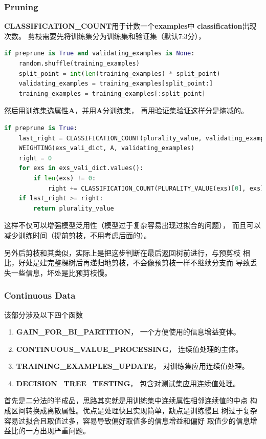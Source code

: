 \documentclass[a4paper, 11pt]{article}
\begin{document}
\subsubsection{Pruning}
\textbf{CLASSIFICATION\_COUNT}用于计数一个\textbf{examples}中
\textbf{classification}出现次数。
剪枝需要先将训练集分为训练集和验证集（默认7:3分），
\begin{lstlisting}[language=python]
if preprune is True and validating_examples is None:
	random.shuffle(training_examples)
	split_point = int(len(training_examples) * split_point)
	validating_examples = training_examples[split_point:]
	training_examples = training_examples[:split_point]
\end{lstlisting}
然后用训练集选属性\textbf{A}，并用\textbf{A}分训练集，
再用验证集验证这样分是熵减的。
\begin{lstlisting}[language=python]
if preprune is True:
	last_right = CLASSIFICATION_COUNT(plurality_value, validating_examples)
	WEIGHTING(exs_vali_dict, A, validating_examples)
	right = 0
	for exs in exs_vali_dict.values():
		if len(exs) != 0:
			right += CLASSIFICATION_COUNT(PLURALITY_VALUE(exs)[0], exs)
	if last_right >= right:
		return plurality_value
\end{lstlisting}
这样不仅可以增强模型泛用性（模型过于复杂容易出现过拟合的问题），
而且可以减少训练时间（提前剪枝，不用考虑后面的）。

另外后剪枝和其类似，实际上是把这步判断在最后返回树前进行，与预剪枝
相比，好处是建完整棵树后再递归地剪枝，不会像预剪枝一样不继续分支而
导致丢失一些信息，坏处是比预剪枝慢。

\subsubsection{Continuous Data}
该部分涉及以下四个函数
\begin{enumerate}
	\item \textbf{GAIN\_FOR\_BI\_PARTITION}，
	一个方便使用的信息增益变体。
	\item \textbf{CONTINUOUS\_VALUE\_PROCESSING}，
	连续值处理的主体。
	\item \textbf{TRAINING\_EXAMPLES\_UPDATE}，
	对训练集应用连续值处理。
	\item \textbf{DECISION\_TREE\_TESTING}，
	包含对测试集应用连续值处理。
\end{enumerate}

首先是二分法的半成品，思路其实就是用训练集中连续属性相邻连续值的中点
构成区间转换成离散属性。优点是处理快且实现简单，缺点是训练慢且
树过于复杂容易过拟合且取值过多，容易导致偏好取值多的信息增益和偏好
取值少的信息增益比的一方出现严重问题。
\end{document}
